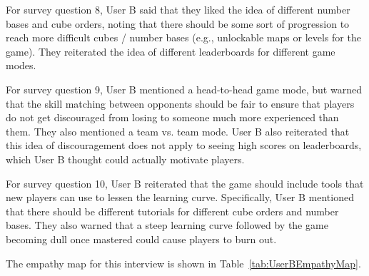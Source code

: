 \documentclass{article}
\begin{document}
For survey question 8, User B said that they liked the idea of different number bases and cube orders, noting that there should be some sort of progression to reach more difficult cubes / number bases (e.g., unlockable maps or levels for the game). They reiterated the idea of different leaderboards for different game modes.

For survey question 9, User B mentioned a head-to-head game mode, but warned that the skill matching between opponents should be fair to ensure that players do not get discouraged from losing to someone much more experienced than them. They also mentioned a team vs. team mode. User B also reiterated that this idea of discouragement does not apply to seeing high scores on leaderboards, which User B thought could actually motivate players.

For survey question 10, User B reiterated that the game should include tools that new players can use to lessen the learning curve. Specifically, User B mentioned that there should be different tutorials for different cube orders and number bases. They also warned that a steep learning curve followed by the game becoming dull once mastered could cause players to burn out.

The empathy map for this interview is shown in Table~\ref{tab:UserBEmpathyMap}.
\end{document}
